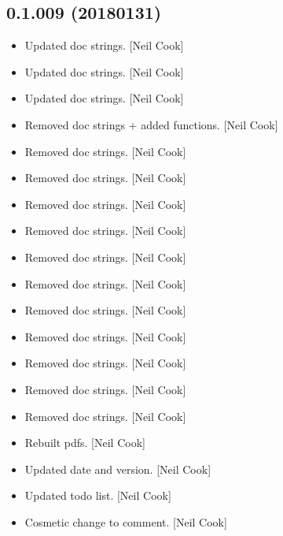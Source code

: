 \documentclass[a4paper,10pt,english]{report}
\begin{document}
\subsection{0.1.009 (2018\sphinxhyphen{}01\sphinxhyphen{}31)}
\label{\detokenize{misc/changelog:id513}}\begin{itemize}
\item {} 
Updated doc strings. {[}Neil Cook{]}

\item {} 
Updated doc strings. {[}Neil Cook{]}

\item {} 
Updated doc strings. {[}Neil Cook{]}

\item {} 
Removed doc strings + added  functions. {[}Neil Cook{]}

\item {} 
Removed doc strings. {[}Neil Cook{]}

\item {} 
Removed doc strings. {[}Neil Cook{]}

\item {} 
Removed doc strings. {[}Neil Cook{]}

\item {} 
Removed doc strings. {[}Neil Cook{]}

\item {} 
Removed doc strings. {[}Neil Cook{]}

\item {} 
Removed doc strings. {[}Neil Cook{]}

\item {} 
Removed doc strings. {[}Neil Cook{]}

\item {} 
Removed doc strings. {[}Neil Cook{]}

\item {} 
Removed doc strings. {[}Neil Cook{]}

\item {} 
Removed doc strings. {[}Neil Cook{]}

\item {} 
Removed doc strings. {[}Neil Cook{]}

\item {} 
Rebuilt pdfs. {[}Neil Cook{]}

\item {} 
Updated date and version. {[}Neil Cook{]}

\item {} 
Updated todo list. {[}Neil Cook{]}

\item {} 
Cosmetic change to comment. {[}Neil Cook{]}

\end{itemize}
\end{document}
